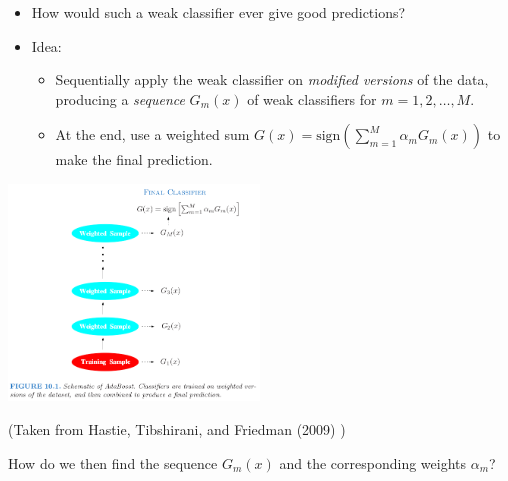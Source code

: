 \documentclass[
  10pt,
  ignorenonframetext,
]{beamer}
\providecommand{\tightlist}{%
  \setlength{\itemsep}{0pt}\setlength{\parskip}{0pt}}
\begin{document}
\begin{frame}
\vspace{2mm}

\begin{itemize}
\tightlist
\item
  How would such a weak classifier ever give good predictions?
\end{itemize}

\vspace{2mm}

\begin{itemize}
\tightlist
\item
  Idea:

  \begin{itemize}
  \tightlist
  \item
    Sequentially apply the weak classifier on \emph{modified versions}
    of the data, producing a \emph{sequence} \(G_m(x)\) of weak
    classifiers for \(m=1,2,\ldots,M\).
  \item
    At the end, use a weighted sum
    \(G(x)=\text{sign}\left( \sum_{m=1}^M \alpha_m G_m(x)\right)\) to
    make the final prediction.
  \end{itemize}
\end{itemize}

\centering

\includegraphics[width=0.5\textwidth,height=\textheight]{fig10_1_elements.png}

\tiny

(Taken from Hastie, Tibshirani, and Friedman (2009) )
\end{frame}

\begin{frame}
\vspace{2mm}

How do we then find the sequence \(G_m(x)\) and the corresponding
weights \(\alpha_m\)?
\end{frame}
\end{document}
